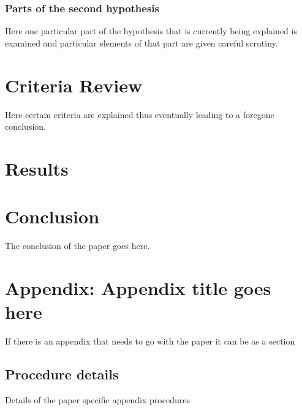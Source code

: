 \subsubsection{Parts of the second hypothesis}

Here one particular part of the hypothesis that is 
currently being explained is examined and particular
elements of that part are given careful scrutiny.

\section{Criteria Review}

Here certain criteria are explained thus eventually
leading to a foregone conclusion.

\section{Results}

\section{Conclusion}\label{conclusion3}

The conclusion of the paper goes here.


\printbibliography[heading=subbibnumbered]

% 
%     

\section{Appendix: Appendix title goes here}
If there is an appendix that needs to go with the paper it can be as a section \cite{zieglerLecturesPolytopes1995}

\subsection{Procedure details}
Details of the paper specific appendix procedures

\cite{buiEveryGeneratingPolytope2023}

